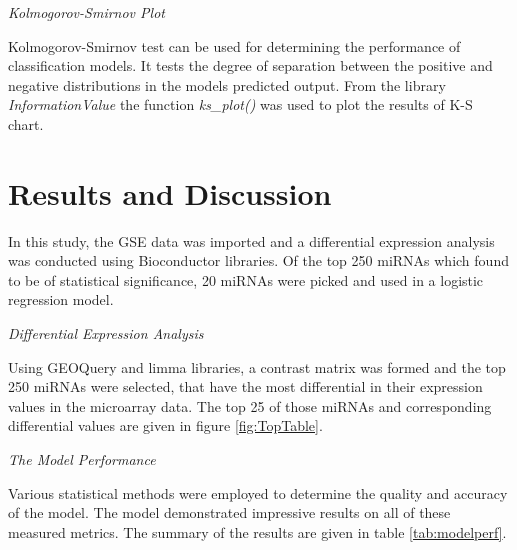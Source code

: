 \documentclass{bioinfo}
\begin{document}
\begin{methods}
{\it Kolmogorov-Smirnov Plot}

Kolmogorov-Smirnov test can be used for determining the performance of classification models. It tests the degree of separation between the positive and negative distributions in the models predicted output. From the library {\it InformationValue} the function {\it ks\_plot()} was used to plot the results of K-S chart.

\end{methods}



\section{Results and Discussion}

In this study, the GSE data was imported and a differential expression analysis was conducted using Bioconductor libraries. Of the top 250 miRNAs which found to be of statistical significance, 20 miRNAs were picked and used in a logistic regression model. 

{\it Differential Expression Analysis}

Using GEOQuery and limma libraries, a contrast matrix was formed and the top 250 miRNAs were selected, that have the most differential in their expression values in the microarray data. The top 25 of those miRNAs and corresponding differential values are given in figure \ref{fig:TopTable}.



{\it The Model Performance}

Various statistical methods were employed to determine the quality and accuracy of the model. The model demonstrated impressive results on all of these measured metrics. The summary of the results are given in table \ref{tab:modelperf}.
\end{document}
